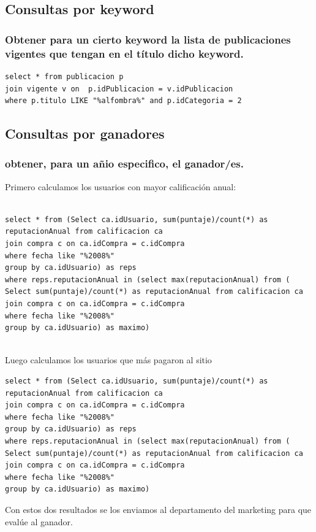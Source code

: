 \documentclass[a4paper, 10pt, twoside]{article}
\begin{document}
\subsection{Consultas por keyword}
\subsubsection{Obtener para un cierto keyword la lista de publicaciones vigentes que tengan en el t\'itulo dicho keyword.}
\begin{verbatim}
select * from publicacion p 
join vigente v on  p.idPublicacion = v.idPublicacion
where p.titulo LIKE "%alfombra%" and p.idCategoria = 2
\end{verbatim}
\newpage
\subsection{Consultas por ganadores}
\subsubsection{ obtener, para un a\~nio especifico, el ganador/es.}
Primero calculamos los usuarios con mayor calificaci\'on anual:
\begin{verbatim}

select * from (Select ca.idUsuario, sum(puntaje)/count(*) as reputacionAnual from calificacion ca
join compra c on ca.idCompra = c.idCompra
where fecha like "%2008%"
group by ca.idUsuario) as reps
where reps.reputacionAnual in (select max(reputacionAnual) from (
Select sum(puntaje)/count(*) as reputacionAnual from calificacion ca
join compra c on ca.idCompra = c.idCompra
where fecha like "%2008%"
group by ca.idUsuario) as maximo)


\end{verbatim}

Luego calculamos los usuarios que m\'as pagaron al sitio
\begin{verbatim}
select * from (Select ca.idUsuario, sum(puntaje)/count(*) as reputacionAnual from calificacion ca
join compra c on ca.idCompra = c.idCompra
where fecha like "%2008%"
group by ca.idUsuario) as reps
where reps.reputacionAnual in (select max(reputacionAnual) from (
Select sum(puntaje)/count(*) as reputacionAnual from calificacion ca
join compra c on ca.idCompra = c.idCompra
where fecha like "%2008%"
group by ca.idUsuario) as maximo)
\end{verbatim}

Con estos dos resultados se los enviamos al departamento del marketing para que eval\'ue al ganador.
\end{document}
